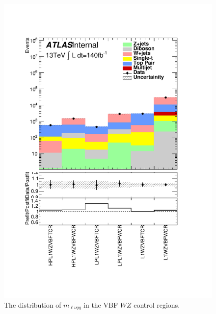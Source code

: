 \begin{figure}[h!]
  \centering
  \includegraphics[width=\hsize]{figures/results/HVTWZVBF/PlotyieldTable_postfit.pdf}
 \caption{The distribution of $m_{\ell\nu qq}$ in the VBF $WZ$ control regions.} 
  \label{fig:hvtwzvbf_cr_postfit}
\end{figure} 
\FloatBarrier


